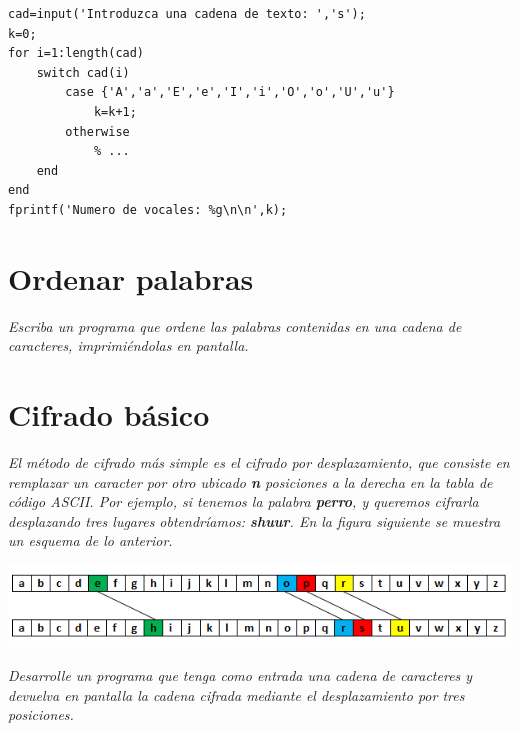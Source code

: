 \begin{verbatim}
cad=input('Introduzca una cadena de texto: ','s');
k=0;
for i=1:length(cad)
    switch cad(i)
        case {'A','a','E','e','I','i','O','o','U','u'}
            k=k+1;
        otherwise
            % ...
    end
end
fprintf('Numero de vocales: %g\n\n',k);
\end{verbatim}


\section{Ordenar palabras}

\textit{Escriba un programa que ordene las palabras contenidas en una cadena de caracteres, imprimiéndolas en pantalla.}





\section{Cifrado básico}

\textit{El método de cifrado más simple es el cifrado por desplazamiento, que consiste en remplazar un caracter 
por otro ubicado {\bf n} posiciones a la derecha en la tabla de código ASCII. Por ejemplo, si tenemos la palabra 
{\bf perro}, y queremos cifrarla desplazando tres lugares obtendríamos: {\bf shuur}. En la figura siguiente se muestra 
un esquema de lo anterior.}

\begin{center}
\includegraphics[scale=0.8]{src/cifrado.png}
\end{center}

\textit{Desarrolle un programa que tenga como entrada una cadena de caracteres y devuelva en pantalla 
la cadena cifrada mediante el desplazamiento por tres posiciones.}


